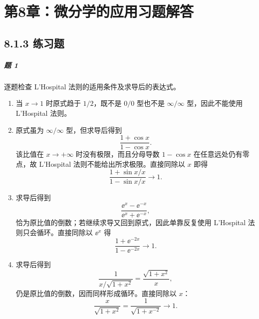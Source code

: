 \chapter*{第8章：微分学的应用习题解答}
\section*{8.1.3 练习题}

\paragraph{题 1}
\begin{xsolution}
逐题检查 L'Hospital 法则的适用条件及求导后的表达式。
\begin{enumerate}[label=(\arabic*)]
  \item 当 $x\to1$ 时原式趋于 $1/2$，既不是 $0/0$ 型也不是 $\infty/\infty$ 型，因此不能使用 L'Hospital 法则。

  \item 原式虽为 $\infty/\infty$ 型，但求导后得到
  \[
    \frac{1+\cos x}{1-\cos x}.
  \]
  该比值在 $x\to+\infty$ 时没有极限，而且分母导数 $1-\cos x$ 在任意远处仍有零点，故 L'Hospital 法则不能给出所求极限。直接同除以 $x$ 即得
  \[
    \frac{1+\sin x/x}{1-\sin x/x}\to1.
  \]

  \item 求导后得到
  \[
    \frac{\ee^x-\ee^{-x}}{\ee^x+\ee^{-x}},
  \]
  恰为原比值的倒数；若继续求导又回到原式，因此单靠反复使用 L'Hospital 法则只会循环。直接同除以 $\ee^x$ 得
  \[
    \frac{1+\ee^{-2x}}{1-\ee^{-2x}}\to1.
  \]

  \item 求导后得到
  \[
    \frac{1}{x/\sqrt{1+x^2}}=\frac{\sqrt{1+x^2}}x,
  \]
  仍是原比值的倒数，因而同样形成循环。直接同除以 $x$：
  \[
    \frac{x}{\sqrt{1+x^2}}=\frac1{\sqrt{1+x^{-2}}}\to1.
  \]
\end{enumerate}
\end{xsolution}

